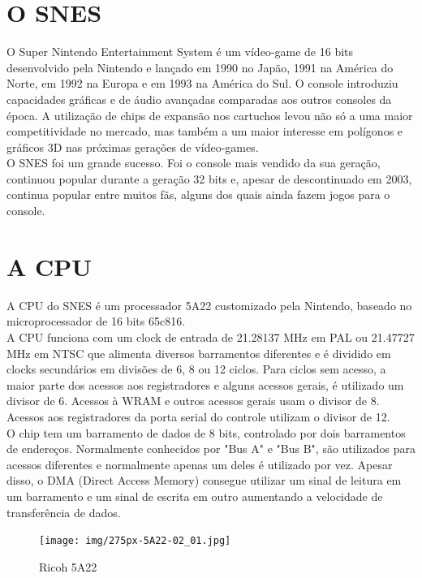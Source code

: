 \documentclass[paper=a4, fontsize=11pt]{scrartcl}	%
\numberwithin{equation}{section}															%
\numberwithin{figure}{section}																%
\numberwithin{table}{section}																%
\begin{document}
\section{O SNES}
O Super Nintendo Entertainment System é um vídeo-game de 16 bits desenvolvido pela Nintendo e lançado em 1990 no Japão, 1991 na América do Norte, em 1992 na Europa e em 1993 na América do Sul.
O console introduziu capacidades gráficas e de áudio avançadas comparadas aos outros consoles da época. A utilização de chips de expansão nos cartuchos levou não só a uma maior competitividade no mercado, mas também a um maior interesse em polígonos e gráficos 3D nas próximas gerações de vídeo-games.\\
O SNES foi um grande sucesso. Foi o console mais vendido da sua geração, continuou popular durante a geração 32 bits e, apesar de descontinuado em 2003\cite{gamespot1}, continua popular entre muitos fãs, alguns dos quais ainda fazem jogos para o console.

\section{A CPU}

A CPU do SNES é um processador 5A22 customizado pela Nintendo, baseado no microprocessador de 16 bits 65c816.\cite{65c815datasheet}\\

A CPU funciona com um clock de entrada de 21.28137 MHz em PAL ou 21.47727 MHz em NTSC que alimenta diversos barramentos diferentes e é dividido em clocks secundários em divisões de 6, 8 ou 12 ciclos. Para ciclos sem acesso, a maior parte dos acessos aos registradores e alguns acessos gerais, é utilizado um divisor de 6. Acessos à WRAM e outros acessos gerais usam o divisor de 8. Acessos aos registradores da porta serial do controle utilizam o divisor de 12.\cite{AnomieMemMap}\\

O chip tem um barramento de dados de 8 bits, controlado por dois barramentos de endereços. Normalmente conhecidos por "Bus A" e "Bus B", são utilizados para acessos diferentes e normalmente apenas um deles é utilizado por vez. Apesar disso, o DMA (Direct Access Memory) consegue utilizar um sinal de leitura em um barramento e um sinal de escrita em outro aumentando a velocidade de transferência de dados.\cite{AnomieRegDoc}\\

\begin{figure}[h!]
	\centering
    \texttt{[image: img/275px-5A22-02\_01.jpg]}
    \caption{Ricoh 5A22}
\end{figure}
\end{document}
